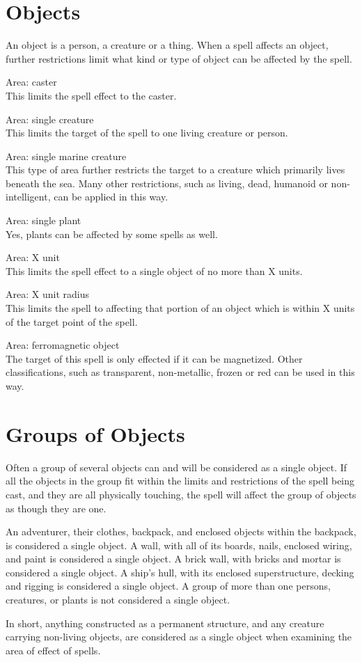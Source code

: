 \section{Objects}
An object is a person, a creature or a thing. When a spell affects an object, further restrictions limit what kind or type of object can be affected by the spell.

Area: caster\\
This limits the spell effect to the caster.

Area: single creature\\
This limits the target of the spell to one living creature or person.

Area: single marine creature\\
This type of area further restricts the target to a creature which primarily lives beneath the sea. Many other restrictions, such as living, dead, humanoid or non-intelligent, can be applied in this way.

Area: single plant\\
Yes, plants can be affected by some spells as well.

Area: X unit\\
This limits the spell effect to a single object of no more than X units.

Area: X unit radius\\
This limits the spell to affecting that portion of an object which is within X units of the target point of the spell.

Area: ferromagnetic object\\
The target of this spell is only effected if it can be magnetized. Other classifications, such as transparent, non-metallic, frozen or red can be used in this way.
\section{Groups of Objects}
Often a group of several objects can and will be considered as a single object. If all the objects in the group fit within the limits and restrictions of the spell being cast, and they are all physically touching, the spell will affect the group of objects as though they are one. 

An adventurer, their clothes, backpack, and enclosed objects within the backpack, is considered a single object. A wall, with all of its boards, nails, enclosed wiring, and paint is considered a single object. A brick wall, with bricks and mortar is considered a single object. A ship's hull, with its enclosed superstructure, decking and rigging is considered a single object. A group of more than one persons, creatures, or plants is not considered a single object.

In short, anything constructed as a permanent structure, and any creature carrying non-living objects, are considered as a single object when examining the area of effect of spells.
